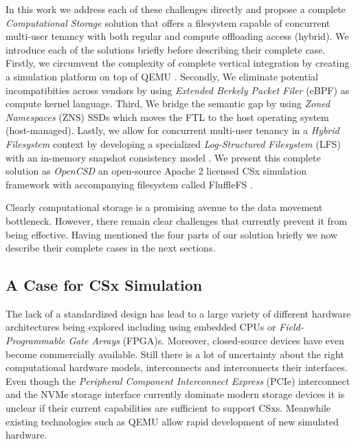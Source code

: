 
In this work we address each of these challenges directly and propose a
complete \textit{Computational Storage} solution that offers a filesystem
capable of concurrent multi-user tenancy with both regular and compute
offloading access (hybrid). We introduce each of the solutions briefly before
describing their complete case. Firstly, we circumvent the complexity of
complete vertical integration by creating a simulation platform on top of
QEMU \cite{qemu}. Secondly, We eliminate potential incompatibities across
vendors by using \textit{Extended Berkely Packet Filer} (eBPF) \cite{what-ebpf}
as compute kernel language. Third, We bridge the semantic gap by using \textit{
Zoned Namespaces} (ZNS) \cite{zns} SSDs which moves the FTL to the host
operating system (host-managed). Lastly, we allow for concurrent multi-user
tenancy in a \textit{Hybrid Filesystem} context by developing a specialized
\textit{Log-Structured Filesystem} (LFS) \cite{Rosenblum1992TheDA} with an
in-memory snapshot consistency model \cite{Viotti2016ConsistencyIN}. We present
this complete solution as \textit{OpenCSD} an open-source Apache 2 licensed CSx
simulation framework with accompanying filesystem called
FluffleFS \cite{qemu-csd}.

Clearly computational storage is a promising avenue to the data movement
bottleneck. However, there remain clear challenges that currently prevent it
from being effective. Having mentioned the four parts of our solution briefly we
now describe their complete cases in the next sections.

\subsection{A Case for CSx Simulation}

The lack of a standardized design has lead to a large variety of different
hardware architectures being explored including using embedded CPUs or
\textit{Field-Programmable Gate Arrays} (FPGA)s. Moreover, closed-source
devices have even become commercially available. Still there is a lot of
uncertainty about the right computational hardware models, interconnects and
interconnects their interfaces. Even though the \textit{Peripheral Component
Interconnect Express} (PCIe) interconnect and the NVMe storage interface
currently dominate modern storage devices it is unclear if their current
capabilities are sufficient to support CSxs. Meanwhile existing technologies
such as QEMU allow rapid development of new simulated hardware.

